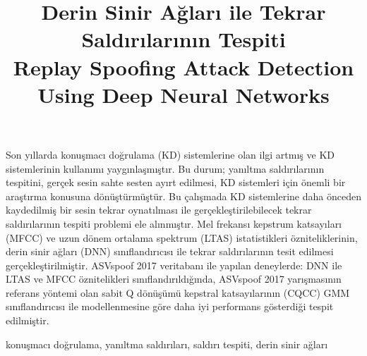 \documentclass[conference, a4paper]{IEEEtran}
\begin{document}

\title{Derin Sinir Ağları ile Tekrar Saldırılarının Tespiti\\
    Replay Spoofing Attack Detection Using Deep Neural Networks}

\author{
    }

\maketitle

\begin{ozet}
    Son yıllarda konuşmacı doğrulama (KD) sistemlerine olan ilgi artmış ve KD sistemlerinin kullanımı yaygınlaşmıştır.
    Bu durum; yanıltma saldırılarının tespitini, gerçek sesin sahte sesten ayırt edilmesi, KD sistemleri için önemli
    bir araştırma konusuna dönüştürmüştür. Bu çalışmada KD sistemlerine daha önceden kaydedilmiş bir sesin tekrar
    oynatılması ile gerçekleştirilebilecek tekrar saldırılarının tespiti problemi ele alınmıştır. Mel frekansı kepstrum
    katsayıları (MFCC) ve uzun dönem ortalama spektrum (LTAS) istatistikleri özniteliklerinin, derin sinir ağları (DNN)
    sınıflandırıcısı ile tekrar saldırılarının tesit edilmesi gerçekleştirilmiştir. ASVspoof 2017 veritabanı ile
    yapılan deneylerde: DNN ile LTAS ve MFCC öznitelikleri sınıflandırıldığında, ASVspoof 2017 yarışmasının referans
    yöntemi olan sabit Q dönüşümü kepstral katsayılarının (CQCC) GMM sınıflandırıcısı ile modellenmesine göre daha iyi
    performans gösterdiği tespit edilmiştir.
\end{ozet}

\begin{IEEEanahtar}
    konuşmacı doğrulama, yanıltma saldırıları, saldırı tespiti, derin sinir ağları
\end{IEEEanahtar}
\end{document}
